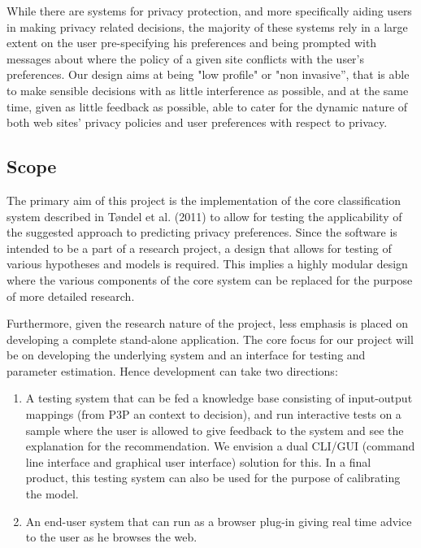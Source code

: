 While there are systems for privacy protection, and more specifically aiding users in making privacy related decisions, the majority of these systems rely in a large extent on the user pre-specifying his preferences and being prompted with messages about where the policy of a given site conflicts with the user's preferences. Our design aims at being "low profile" or "non invasive'', that is able to make sensible decisions with as little interference as possible, and at the same time, given as little feedback as possible, able to cater for the dynamic nature of both web sites' privacy policies and user preferences with respect to privacy.

\subsection{Scope}\label{reqScope}

The primary aim of this project is the implementation of the core classification system described in T{\o}ndel et al. (2011) to allow for testing the applicability of the suggested approach to predicting privacy preferences. Since the software is intended to be a part of a research project, a design that allows for testing of various hypotheses and models is required. This implies a highly modular design where the various components of the core system can be replaced for the purpose of more detailed research. 

Furthermore, given the research nature of the project, less emphasis is placed on developing a complete stand-alone application. The core focus for our project will be on developing the underlying system and an interface for testing and parameter estimation. Hence development can take two directions:

\begin{enumerate}
\item A testing system that can be fed a knowledge base consisting of input-output mappings (from P3P  an context to decision), and run interactive tests on a sample where the user is allowed to give feedback to the system and see the explanation for the recommendation. We envision a dual CLI/GUI (command line interface and graphical user interface) solution for this. In a final product, this testing system can also be used for the purpose of calibrating the model.
\item An end-user system that can run as a browser plug-in giving real time advice to the user as he browses the web.
\end{enumerate}

